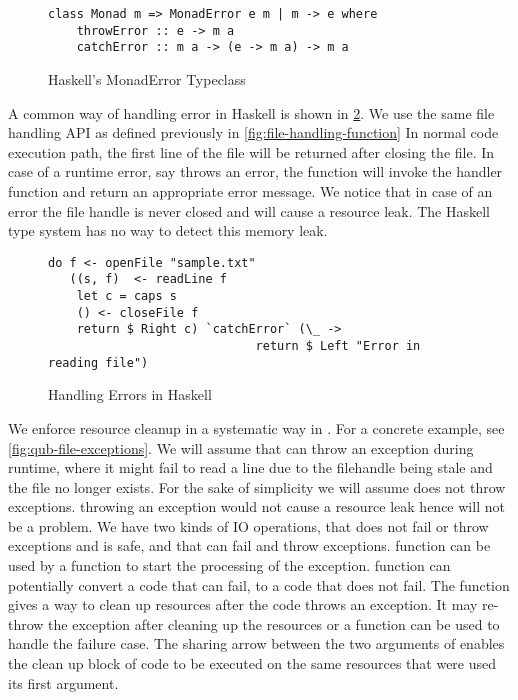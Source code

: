 \begin{figure}[h]
  \begin{framed}
\begin{verbatim}
class Monad m => MonadError e m | m -> e where
    throwError :: e -> m a
    catchError :: m a -> (e -> m a) -> m a
\end{verbatim}
  \end{framed}
  \caption{Haskell's MonadError Typeclass}
  \label{fig:haskell-monaderror}
\end{figure}

\noindent
A common way of handling error in Haskell is shown in \cref{fig:haskell-error-handling}.
We use the same file handling API as defined previously in \cref{fig:file-handling-function}
In normal code execution path, the first line of the file will be returned after closing the file.
In case of a runtime error, say  throws an error, the  function will
invoke the handler function and return an appropriate error message. We notice that in case of an error the file handle 
is never closed and will cause a resource leak. The Haskell type system has no way to detect this memory leak.

\begin{figure}[h]
  \begin{framed}
\begin{verbatim}
do f <- openFile "sample.txt"
   ((s, f)  <- readLine f
    let c = caps s
    () <- closeFile f
    return $ Right c) `catchError` (\_ ->
                             return $ Left "Error in reading file")
\end{verbatim}
  \end{framed}
  \caption{Handling Errors in Haskell}
  \label{fig:haskell-error-handling}
\end{figure}

We enforce resource cleanup in a systematic way in \qub{}. For a concrete example, see \cref{fig:qub-file-exceptions}.
We will assume that  can throw an exception during runtime, where
it might fail to read a line due to the filehandle being stale and the file no longer exists.
For the sake of simplicity we will assume 
does not throw exceptions.  throwing an exception would not cause a resource leak hence will not be a problem.
We have two kinds of IO operations,  that does not fail or throw exceptions and is safe,
and  that can fail and throw exceptions.  function can be used by a function to start
the processing of the exception.  function can potentially convert a code that can fail, to a code
that does not fail. The  function gives a way to clean up resources after the code throws an exception. It may re-throw the
exception after cleaning up the resources or a  function can be used to handle the failure case.
The sharing arrow between the two arguments of  enables the clean up block of code to be executed on the same resources
that were used its first argument.

